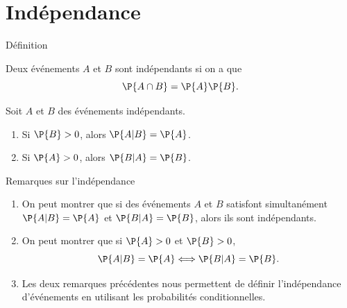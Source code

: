 \documentclass[nuit,charter,pied]{BeamerJS}
\begin{document}
\section{Indépendance}

\begin{frame}{Définition}
	\begin{defn}
		Deux événements $A$ et $B$ sont indépendants si on a que
		\[\P{A\cap B}=\P{A}\P{B}.\]
	\end{defn}
	\pause
	\begin{prop}
		Soit $A$ et $B$ des événements indépendants.
		\begin{enumerate}
			\item Si $\P{B}>0$, alors $\P{A|B}=\P{A}$.
			\item Si $\P{A}>0$, alors $\P{B|A}=\P{B}$.
		\end{enumerate}
	\end{prop}
\end{frame}

\begin{frame}{Remarques sur l'indépendance}
\pause
	\begin{enumerate}
		\item On peut montrer que si  des événements $A$ et $B$ satisfont simultanément $\P{A|B}=\P{A}$ et $\P{B|A}=\P{B}$, alors ils sont indépendants.\pause
		\item On peut montrer que si $\P{A}>0$ et $\P{B}>0$,
			\[\P{A|B}=\P{A}\Longleftrightarrow\P{B|A}=\P{B}.\]\pause
		\item Les deux remarques précédentes nous permettent de définir l'indépendance d'événements en utilisant les probabilités conditionnelles.
	\end{enumerate}
\end{frame}
\end{document}
